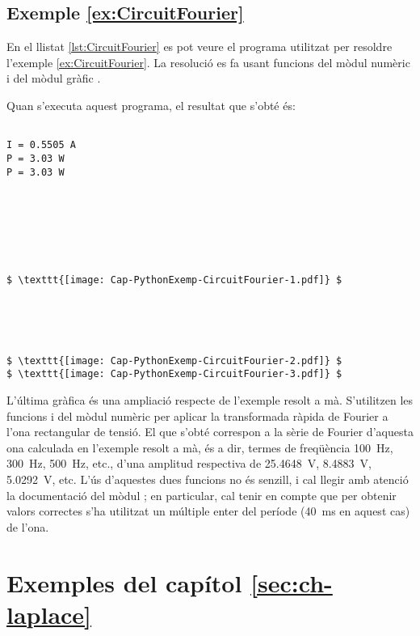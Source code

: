 \hypertarget{exemple:CircuitFourier}{\subsection{Exemple \ref*{ex:CircuitFourier} \CircuitFourier}}
En el llistat \vref{lst:CircuitFourier} es pot veure el programa utilitzat per resoldre l'exemple \vref{ex:CircuitFourier}. La resolució es fa usant funcions del mòdul numèric  i del mòdul gràfic  .


Quan s'executa aquest programa, el resultat que s'obté és:
\lstset{
	language=,
	numbers=none,
	frame=none
}
\begin{lstlisting}[mathescape=true]
	
I = 0.5505 A
P = 3.03 W
P = 3.03 W







$ \texttt{[image: Cap-PythonExemp-CircuitFourier-1.pdf]} $





$ \texttt{[image: Cap-PythonExemp-CircuitFourier-2.pdf]} $
$ \texttt{[image: Cap-PythonExemp-CircuitFourier-3.pdf]} $
\end{lstlisting} 

L'última gràfica és una ampliació respecte de l'exemple resolt a mà. S'utilitzen les funcions  i  del mòdul numèric  per aplicar la transformada ràpida de Fourier a l'ona rectangular de tensió. El que s'obté correspon a la sèrie de Fourier d'aquesta ona calculada en l'exemple resolt a  mà, és a dir, termes de freqüència \qty{100}{Hz}, \qty{300}{Hz}, \qty{500}{Hz}, etc., d'una amplitud respectiva de \qty{25,4648}{V}, \qty{8,4883}{V}, \qty{5,0292}{V}, etc. L'ús d'aquestes dues funcions no és senzill, i cal llegir amb atenció la documentació del mòdul ; en particular, cal tenir en compte que per obtenir valors correctes s'ha utilitzat un múltiple enter del període (\qty{40}{ms} en aquest cas) de l'ona.


\section{Exemples del capítol \ref*{sec:ch-laplace}}

